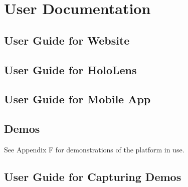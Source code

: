 

\chapter{User Documentation}

\section{User Guide for Website}

\section{User Guide for HoloLens}

\section{User Guide for Mobile App}

\section{Demos}

See Appendix F for demonstrations of the platform in use. 

\section{User Guide for Capturing Demos}

